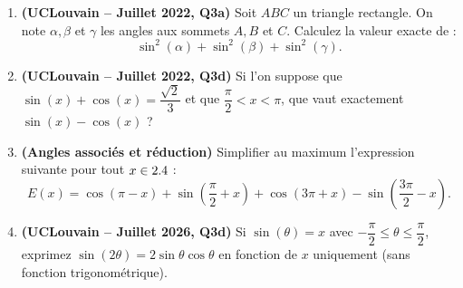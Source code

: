 \begin{enumerate}[label=\textbf{Exercice 1.\arabic* --}, align=left, leftmargin=*]
    \item \textbf{(UCLouvain -- Juillet 2022, Q3a)} Soit $ABC$ un triangle rectangle. On note $\alpha, \beta$ et $\gamma$ les angles aux sommets $A, B$ et $C$. Calculez la valeur exacte de :
    \[
        \sin^2(\alpha) + \sin^2(\beta) + \sin^2(\gamma).
    \]

    \item \textbf{(UCLouvain -- Juillet 2022, Q3d)} Si l'on suppose que $\sin(x) + \cos(x) = \dfrac{\sqrt{2}}{3}$ et que $\dfrac{\pi}{2} < x < \pi$, que vaut exactement $\sin(x) - \cos(x)$ ?

    \item \textbf{(Angles associés et réduction)} Simplifier au maximum l'expression suivante pour tout $x \in 2.4$ :
    \[
        E(x) = \cos(\pi - x) + \sin\left(\frac{\pi}{2} + x\right) + \cos(3\pi + x) - \sin\left(\frac{3\pi}{2} - x\right).
    \]

    \item \textbf{(UCLouvain -- Juillet 2026, Q3d)} Si $\sin(\theta) = x$ avec $-\dfrac{\pi}{2} \le \theta \le \dfrac{\pi}{2}$, exprimez $\sin(2\theta) = 2\sin\theta\cos\theta$ en fonction de $x$ uniquement (sans fonction trigonométrique).
\end{enumerate}
